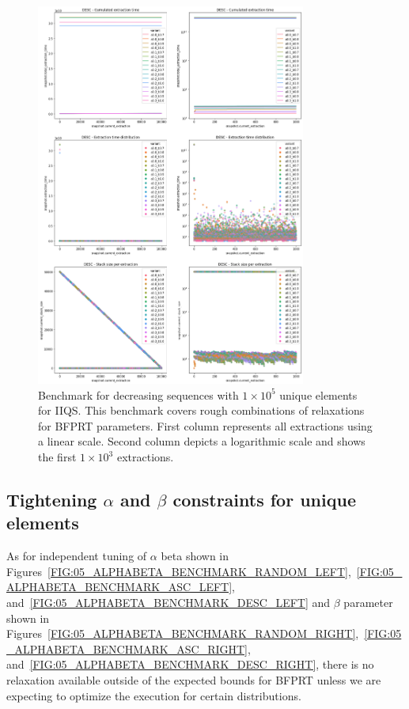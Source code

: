 \begin{figure}[!ht]
    \centering
    \includegraphics[width=0.79\textwidth]{./fragments/04_experimental_execution/images/04_alphabeta_detail_decreasing.png}
    \caption{Benchmark for decreasing sequences with $1\times10^5$ unique elements for IIQS. This benchmark covers rough combinations of relaxations for BFPRT parameters. First column represents all extractions using a linear scale. Second column depicts a logarithmic scale and shows the first $1\times10^3$ extractions. }
    \label{FIG:05_ALPHABETA_BENCHMARK_DESC}
\end{figure}


\subsection{Tightening $\alpha$ and $\beta$ constraints for unique elements}

As for independent tuning of $\alpha$ beta shown in Figures~\ref{FIG:05_ALPHABETA_BENCHMARK_RANDOM_LEFT},~\ref{FIG:05_ALPHABETA_BENCHMARK_ASC_LEFT}, and~\ref{FIG:05_ALPHABETA_BENCHMARK_DESC_LEFT} and $\beta$ parameter shown in Figures~\ref{FIG:05_ALPHABETA_BENCHMARK_RANDOM_RIGHT},~\ref{FIG:05_ALPHABETA_BENCHMARK_ASC_RIGHT}, and~\ref{FIG:05_ALPHABETA_BENCHMARK_DESC_RIGHT}, there is no relaxation available outside of the expected bounds for BFPRT unless we are expecting to optimize the execution for certain distributions.

